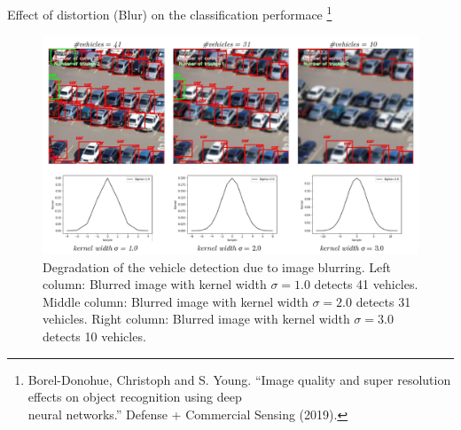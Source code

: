 \documentclass{libs/ufc_format}
\begin{document}
\begin{frame}{\small Effect of distortion (Blur) on the classification performace \footnote[frame]{\tiny Borel-Donohue, Christoph and S. Young. “Image quality and super resolution effects on object recognition using deep \\ neural networks.” Defense + Commercial Sensing (2019).}}
    \begin{figure}
        \centering
        \includegraphics[scale=0.2]{libs/blureffect.png}
        \caption{Degradation of the vehicle detection due to image blurring. Left column: Blurred image with kernel width $\sigma=1.0$ detects 41 vehicles. Middle column: Blurred image with kernel width $\sigma=2.0$ detects 31 vehicles. Right column: Blurred image with kernel width $\sigma=3.0$ detects 10 vehicles.}
        \label{fig:challenge}
    \end{figure}

\end{frame}
\end{document}
